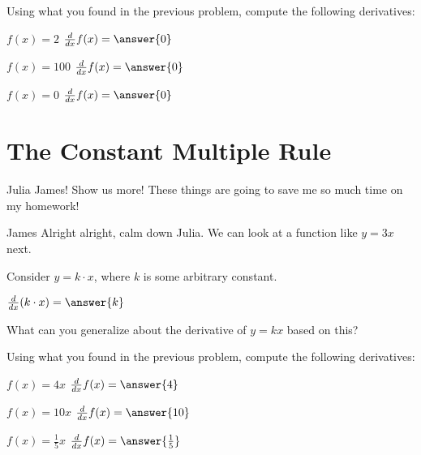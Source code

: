 \documentclass{ximera}
\begin{document}
\begin{question}
Using what you found in the previous problem, compute the following derivatives:

$f(x)=2$ \hspace{14mm} $\frac{d}{dx} f(x) =  \answer{0}$

$f(x)=100$ \hspace{10mm} $\frac{d}{dx} f(x) =  \answer{0}$

$f(x)=0$ \hspace{13mm} $\frac{d}{dx} f(x) =  \answer{0}$

\end{question}

\section{The Constant Multiple Rule}
\begin{dialogue}
\item[Julia] James! Show us more! These things are going to save me so much time on my homework!
\item[James] Alright alright, calm down Julia. We can look at a function like $y = 3x$ next.
\end{dialogue}

Consider $y = k \cdot x$, where $k$ is some arbitrary constant.
\begin{question}
$\frac{d}{dx} (k \cdot x) = \answer{k}$

What can you generalize about the derivative of $y = kx$ based on this?

\begin{multipleChoice}
\end{multipleChoice}
\end{question}

\begin{question}
\item{Using what you found in the previous problem, compute the following derivatives:}

$f(x) = 4x$ \hspace{12mm} $\frac{d}{dx} f(x) =  \answer{4}$

$f(x) = 10x$ \hspace{10mm} $\frac{d}{dx} f(x) =  \answer{10}$

$f(x) = \frac{1}{5}x$ \hspace{11mm} $\frac{d}{dx} f(x) =  \answer{\frac{1}{5}}$
\end{question}
\end{document}
